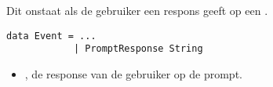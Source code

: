 Dit  onstaat als de gebruiker een respons geeft op een . 
\begin{lstlisting}
data Event = ...
			| PromptResponse String
\end{lstlisting}
\begin{itemize}
	\item {}, de response van de gebruiker op de prompt.
\end{itemize}















